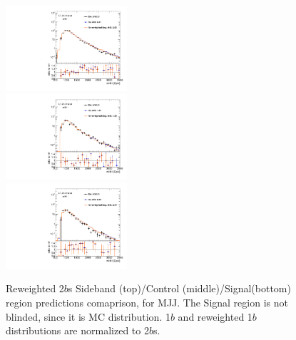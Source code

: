 \begin{figure}[htbp!]
\begin{center}
\includegraphics[width=0.4\textwidth,angle=-90]{figures/boosted/AppendixReweight/Compare/Dijet_Sideband_directcompare_mHH_l_1.pdf}\\
\includegraphics[width=0.4\textwidth,angle=-90]{figures/boosted/AppendixReweight/Compare/Dijet_Control_directcompare_mHH_l_1.pdf}\\
\includegraphics[width=0.4\textwidth,angle=-90]{figures/boosted/AppendixReweight/Compare/Dijet_Signal_directcompare_mHH_l_1.pdf}
\caption{Reweighted 2$b$s Sideband (top)/Control (middle)/Signal(bottom) region predictions comaprison, for MJJ. The Signal region is not blinded, since it is MC distribution. 1$b$ and reweighted 1$b$ distributions are normalized to 2$b$s.}
\label{fig:app-rw-comp-dijet-2bs}
\end{center}
\end{figure}

